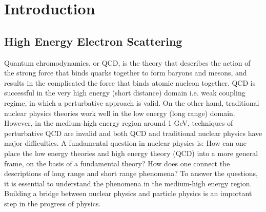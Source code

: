 

\chapter{Introduction}
\label{Introduction}


\section{High Energy Electron Scattering}


%

Quantum chromodynamics, or QCD, is the theory that describes the action of the strong force that binds quarks together to form baryons and
mesons, and results in the complicated the force that binds atomic nucleon together. QCD is successful in the very high energy (short distance) domain
i.e. weak coupling regime, in which a perturbative approach is valid. On the other hand, traditional nuclear physics theories work well in the
low energy (long range) domain. However, in the medium-high energy region around 1 GeV, techniques of perturbative QCD are invalid and both
QCD and traditional nuclear physics have major difficulties. A fundamental question in nuclear physics is: How can one place the low energy theories
and high energy theory (QCD) into a more general frame, on the basis of a fundamental theory? How does one connect the descriptions of long range
and short range phenomena? To answer the questions, it is essential to understand the phenomena in the medium-high energy region. Building a
bridge between nuclear physics and particle physics is an important step in the progress of physics.

